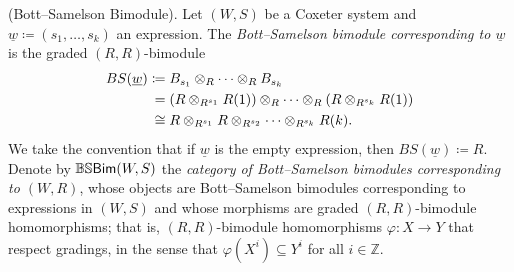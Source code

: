 \noindent\begin{definition}\textnormal{(Bott--Samelson Bimodule).} Let $(W, S)$ be a Coxeter system and $\underline{w} \coloneqq (s_1, \dots, s_k)$ an expression. The {\em Bott--Samelson bimodule corresponding to $\underline{w}$} is the graded $(R, R)$-bimodule
\begin{align*}
\begin{split}
BS(\underline{w}) &\coloneqq B_{s_1} \otimes_R \cdots \otimes_R B_{s_k}\\
&\hphantom{\coloneqq}\nhphantom{=}= (R \otimes_{R^{s_1}} R(1)) \otimes_R \cdots \otimes_R (R \otimes_{R^{s_k}} R(1))\\
&\hphantom{\coloneqq}\nhphantom{$\cong$}\cong R \otimes_{R^{s_1}} R \otimes_{R^{s_2}} \cdots \otimes_{R^{s_k}} R(k).
\end{split}
\end{align*}
\noindent We take the convention that if $\underline{w}$ is the empty expression, then $BS(\underline{w}) \coloneqq R$. Denote by $\mathbb{BS}\textnormal{\textsf{Bim}}(W, S)$ the {\em category of Bott--Samelson bimodules corresponding to $(W, R)$}, whose objects are Bott--Samelson bimodules corresponding to expressions in $(W, S)$ and whose morphisms are graded $(R, R)$-bimodule homomorphisms; that is, $(R, R)$-bimodule homomorphisms $\varphi : X \to Y$ that respect gradings, in the sense that $\varphi(X^i) \subseteq Y^i$ for all $i \in \mathbb{Z}$.\\
\end{definition}

